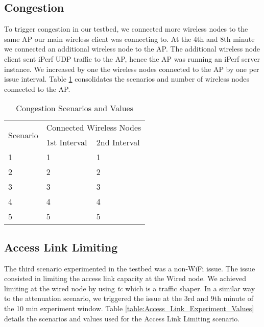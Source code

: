 \subsection*{Congestion}

To trigger congestion in our testbed, we connected more wireless nodes to the same AP our main wireless client was connecting to. At the 4th and 8th minute we connected an additional wireless node to the AP. The additional wireless node client sent iPerf UDP traffic to the AP, hence the AP was running an iPerf server instance. We increased by one the wireless nodes connected to the AP by one per issue interval. Table \ref{table:Congestion_Experiment_Values} consolidates the scenarios and number of wireless nodes connected to the AP.

\begin{table}[h!]
	\begin{center}
		\begin{tabular}{|| m{5em} | m{2cm}| m{2cm} ||}
			\hline
			\multirow{2}{*}{Scenario} & \multicolumn{2}{l||}{Connected Wireless Nodes} \\ \cline{2-3} 
			& \multicolumn{1}{l|}{1st Interval} & \multicolumn{1}{l||}{2nd Interval} \\ \hline\hline
			1 & 1 & 1 \\ \hline
			2 & 2 & 2 \\ \hline
			3 & 3 & 3 \\ \hline
			4 & 4 & 4 \\ \hline
			5 & 5 & 5 \\ \hline
		\end{tabular}
	\end{center}
	\caption{Congestion Scenarios and Values}
	\label{table:Congestion_Experiment_Values}
\end{table}

\subsection*{Access Link Limiting}

The third scenario experimented in the testbed was a non-WiFi issue. The issue consisted in limiting the access link capacity at the Wired node. We achieved limiting at the wired node by using \emph{tc} which is a traffic shaper. In a similar way to the attenuation scenario, we triggered the issue at the 3rd and 9th minute of the 10 min experiment window. Table \ref{table:Access_Link_Experiment_Values} details the scenarios and values used for the Access Link Limiting scenario.

